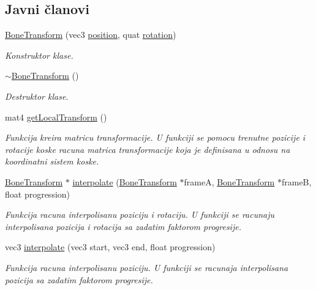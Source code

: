 \subsection*{Javni članovi}
\begin{DoxyCompactItemize}
\item 
\hyperlink{classanimation_1_1BoneTransform_aaed7954137aada7aec413b64664f0e98}{Bone\+Transform} (vec3 \hyperlink{classanimation_1_1BoneTransform_acb46d77828eabe58da347d94dbf7198e}{position}, quat \hyperlink{classanimation_1_1BoneTransform_a3e8c723b186841dcc21d5548944d243b}{rotation})
\begin{DoxyCompactList}\small\item\em Konstruktor klase. \end{DoxyCompactList}\item 
\hyperlink{classanimation_1_1BoneTransform_a269100a100f34b2116bd5aacd1821c12}{$\sim$\+Bone\+Transform} ()
\begin{DoxyCompactList}\small\item\em Destruktor klase. \end{DoxyCompactList}\item 
mat4 \hyperlink{classanimation_1_1BoneTransform_a6a79147d90aecac6c5481927be659ca7}{get\+Local\+Transform} ()
\begin{DoxyCompactList}\small\item\em Funkcija kreira matricu transformacije. U funkciji se pomocu trenutne pozicije i rotacije koske racuna matrica transformacije koja je definisana u odnosu na koordinatni sistem koske. \end{DoxyCompactList}\item 
\hyperlink{classanimation_1_1BoneTransform}{Bone\+Transform} $\ast$ \hyperlink{classanimation_1_1BoneTransform_a5901bd53ff37e252e70020b9a232c0d6}{interpolate} (\hyperlink{classanimation_1_1BoneTransform}{Bone\+Transform} $\ast$frameA, \hyperlink{classanimation_1_1BoneTransform}{Bone\+Transform} $\ast$frameB, float progression)
\begin{DoxyCompactList}\small\item\em Funkcija racuna interpolisanu poziciju i rotaciju. U funkciji se racunaju interpolisana pozicija i rotacija sa zadatim faktorom progresije. \end{DoxyCompactList}\item 
vec3 \hyperlink{classanimation_1_1BoneTransform_a4ddd09561114b38b70a4933ec329618d}{interpolate} (vec3 start, vec3 end, float progression)
\begin{DoxyCompactList}\small\item\em Funkcija racuna interpolisanu poziciju. U funkciji se racunaja interpolisana pozicija sa zadatim faktorom progresije. \end{DoxyCompactList}\end{DoxyCompactItemize}
